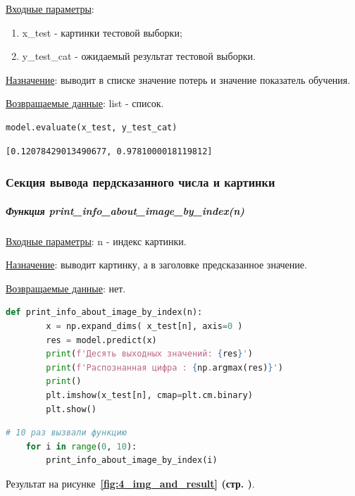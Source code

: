 \underline{Входные параметры}:
\begin{enumerate}
    \item x\_test - картинки тестовой выборки;
    \item y\_test\_cat - ожидаемый результат тестовой выборки.
\end{enumerate}

\underline{Назначение}: выводит в списке значение потерь и значение показатель обучения.

\underline{Возвращаемые данные}: list - список.

\begin{lstlisting}[language=Python,]
    model.evaluate(x_test, y_test_cat)
\end{lstlisting}

\begin{lstlisting}[name=Вывод в консоль,]
    [0.12078429013490677, 0.9781000018119812]
\end{lstlisting}



\subsubsection*{Секция вывода пердсказанного числа и картинки}

\subparagraph{Функция print\_info\_about\_image\_by\_index(n)} \hspace{0pt}

\underline{Входные параметры}: n - индекс картинки.

\underline{Назначение}: выводит картинку, а в заголовке предсказанное значение.

\underline{Возвращаемые данные}: нет.

\begin{lstlisting}[language=Python,]
    def print_info_about_image_by_index(n):
        x = np.expand_dims( x_test[n], axis=0 )
        res = model.predict(x)
        print(f'Десять выходных значений: {res}')
        print(f'Распознанная цифра : {np.argmax(res)}')
        print()
        plt.imshow(x_test[n], cmap=plt.cm.binary)
        plt.show()
\end{lstlisting}

\begin{lstlisting}[language=Python,]
    # 10 раз вызвали функцию
    for i in range(0, 10):
        print_info_about_image_by_index(i)
\end{lstlisting}

Результат на
рисунке~\textbf{\ref{fig:4_img_and_result} (стр. \pageref{fig:4_img_and_result})}.

